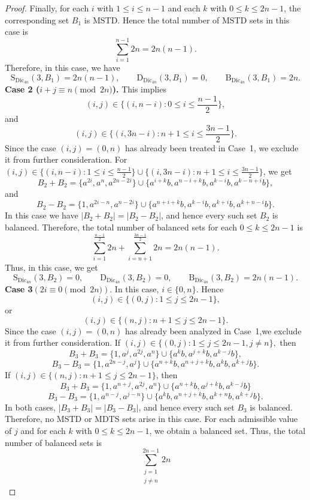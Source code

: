 \documentclass[11pt,reqno]{amsart}
\numberwithin{equation}{section}
\begin{document}
\begin{proof}
Finally, for each $i$ with $1\le i\le n-1$ and each $k$ with $0\le k\le 2n-1$, the corresponding set $B_1$ is MSTD. Hence the total number of MSTD sets in this case is
$$\sum_{i=1}^{n-1}2n=2n(n-1).$$
Therefore, in this case, we have 
\begin{equation}\label{eq:case1-counts}
\mathrm{S}_{\mathrm{Dic}_{4n}}(3,B_1)=2n(n-1), \qquad
\mathrm{D}_{\mathrm{Dic}_{4n}}(3,B_1)=0, \qquad
\mathrm{B}_{\mathrm{Dic}_{4n}}(3,B_1)=2n.
\end{equation}
\textbf{Case 2 ($i+j\equiv n \pmod{2n}$).} This implies 
$$(i,j)\in\{(i,n-i): 0\le i\le \frac{n-1}{2}\},$$
and $$(i,j)\in \{(i,3n-i) :n+1\le i\le \frac{3n-1}{2}\}.$$
Since the case $(i,j)=(0,n)$ has already been treated in Case~1, we exclude it from further consideration. For $(i,j)\in\{(i,n-i): 1\le i\le \frac{n-1}{2}\}\cup \{(i,3n-i) :n+1\le i\le \frac{3n-1}{2}\}$, we get 
$$B_2+B_2=\{a^{2i},a^{n},a^{2n-2i}\}\cup
\{a^{i+k}b,a^{n-i+k}b,a^{k-i}b,a^{k-n+i}b\},
$$
and 
$$B_2-B_2=\{1,a^{2i-n},a^{n-2i}\}\cup
\{a^{n+i+k}b,a^{k-i}b,a^{k+i}b,a^{k+n-i}b\}.
$$ In this case we have $|B_2+B_2|=|B_2-B_2|$, and hence every such set $B_2$ is balanced.  Therefore, the total number of balanced sets for each $0\leq k \leq 2n-1$ is
$$\sum_{i=1}^{\frac{n-1}{2}}2n+\sum_{i=n+1}^{\frac{3n-1}{2}}2n
=2n(n-1).
$$
Thus, in this case, we get 
\begin{equation}\label{eq:case2-counts}
\mathrm{S}_{\mathrm{Dic}_{4n}}(3,B_2)=0, \qquad
\mathrm{D}_{\mathrm{Dic}_{4n}}(3,B_2)=0, \qquad
\mathrm{B}_{\mathrm{Dic}_{4n}}(3,B_2)=2n(n-1).
\end{equation}
\textbf{Case 3}$(2i\equiv 0 \pmod{2n})$. 
In this case, $i\in \{0,n\}$. Hence  $$(i,j)\in \{(0,j):1\leq j\leq 2n-1\},$$ or  $$(i,j)\in\{(n,j): n+1\leq j\leq 2n-1\}.$$ Since the case $(i,j)=(0,n)$ has already been analyzed in Case~1,we exclude it from further consideration.  
If $(i,j)\in \{(0,j):1\leq j\leq 2n-1,j\neq n\},$ then  
$$B_{3}+B_{3}=\{1,a^{j},a^{2j},a^n\}\cup\{a^{k}b,a^{j+k}b,a^{k-j}b\},$$ 
$$B_{3}-B_{3}=\{1,a^{2n-j},a^{j}\}\cup \{a^{n+k}b,a^{n+j+k}b,a^{k}b,a^{k+j}b\}.$$
If $(i,j)\in\{(n,j): n+1\leq j\leq 2n-1\}$, then
$$B_{3}+B_{3}=\{1,a^{n+j},a^{2j},a^n\}\cup\{a^{n+k}b,a^{j+k}b,a^{k-j}b\}$$ 
$$B_{3}-B_{3}=\{1,a^{n-j},a^{j-n}\}\cup \{a^{k}b,a^{n+j+k}b,a^{k+n}b,a^{k+j}b\}.$$
In both cases, $|B_3+B_3|=|B_3-B_3|$, and hence every such set $B_3$ is balanced. Therefore, no MSTD or MDTS sets arise in this case. 
For each admissible value of $j$ and for each $k$ with $0\le k\le 2n-1$, we obtain a balanced set. Thus, the total number of balanced sets is
$$
\sum_{\substack{j=1 \\ j\neq n}}^{2n-1}2n
$$
\end{proof}
\end{document}
